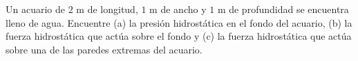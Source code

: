 \item Un acuario de $2 \text{ m}$ de longitud, $1 \text{ m}$ de ancho y $1 \text{ m}$ de profundidad se encuentra lleno de agua. Encuentre (a) la presión hidrostática en el fondo del acuario, (b) la fuerza hidrostática que actúa sobre el fondo y (c) la fuerza hidrostática que actúa sobre una de las paredes extremas del acuario.

